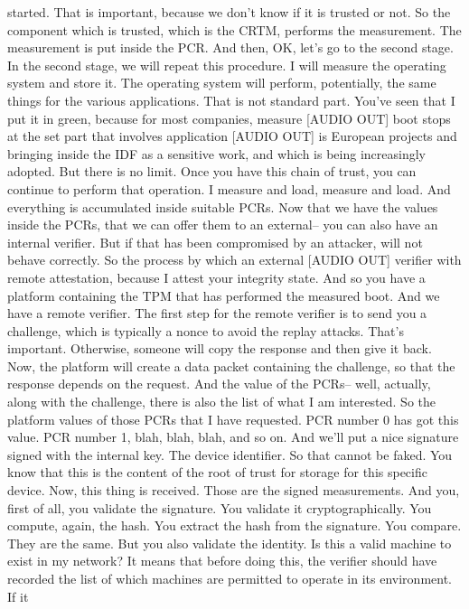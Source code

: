  started. That is important, because we don't know if it is trusted or not. So
 the component which is trusted, which is the CRTM, performs the measurement.
 The measurement is put inside the PCR. And then, OK, let's go to the second
 stage. In the second stage, we will repeat this procedure. I will measure the
 operating system and store it. The operating system will perform, potentially,
 the same things for the various applications. That is not standard part.
 You've seen that I put it in green, because for most companies, measure [AUDIO
 OUT] boot stops at the set part that involves application [AUDIO OUT] is
 European projects and bringing inside the IDF as a sensitive work, and which
 is being increasingly adopted. But there is no limit. Once you have this chain
 of trust, you can continue to perform that operation. I measure and load,
 measure and load. And everything is accumulated inside suitable PCRs. Now that
 we have the values inside the PCRs, that we can offer them to an external--
 you can also have an internal verifier. But if that has been compromised by an
 attacker, will not behave correctly. So the process by which an external
 [AUDIO OUT] verifier with remote attestation, because I attest your integrity
 state. And so you have a platform containing the TPM that has performed the
 measured boot. And we have a remote verifier. The first step for the remote
 verifier is to send you a challenge, which is typically a nonce to avoid the
 replay attacks. That's important. Otherwise, someone will copy the response
 and then give it back. Now, the platform will create a data packet containing
 the challenge, so that the response depends on the request. And the value of
 the PCRs-- well, actually, along with the challenge, there is also the list of
 what I am interested. So the platform values of those PCRs that I have
 requested. PCR number 0 has got this value. PCR number 1, blah, blah, blah,
 and so on. And we'll put a nice signature signed with the internal key. The
 device identifier. So that cannot be faked. You know that this is the content
 of the root of trust for storage for this specific device. Now, this thing is
 received. Those are the signed measurements. And you, first of all, you
 validate the signature. You validate it cryptographically. You compute, again,
 the hash. You extract the hash from the signature. You compare. They are the
 same. But you also validate the identity. Is this a valid machine to exist in
 my network? It means that before doing this, the verifier should have recorded
 the list of which machines are permitted to operate in its environment. If it
